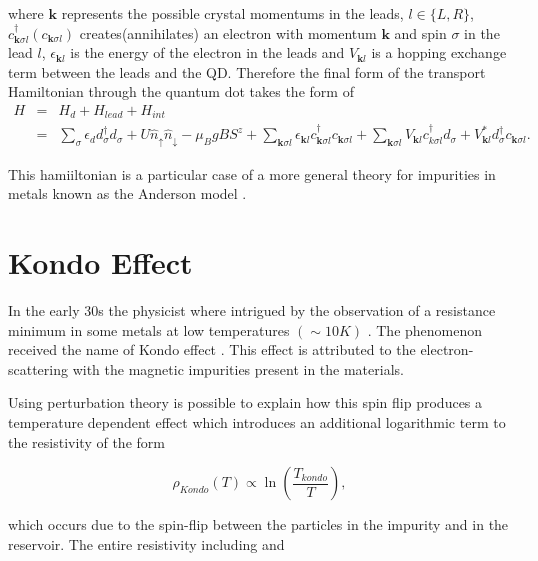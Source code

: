 where $\mathbf{k}$ represents the possible crystal momentums in the
leads, $l\in\{L,R\}$, $c_{\mathbf{k}\sigma l}^{\dagger}(c_{\mathbf{k}\sigma l})$
creates(annihilates) an electron with momentum $\mathbf{k}$ and spin
$\sigma$ in the lead $l$, $\epsilon_{\mathbf{k}l}$ is the energy
of the electron in the leads and $V_{\mathbf{k}l}$ is a hopping exchange
term between the leads and the QD. Therefore the final form of the
transport Hamiltonian through the quantum dot takes the form of 
\begin{eqnarray}
H & = & H_{d}+H_{lead}+H_{int}\nonumber \\
 & = & \sum_{\sigma}\epsilon_{d}d_{\sigma}^{\dagger}d_{\sigma}+U\hat{n}_{\uparrow}\hat{n}_{\downarrow}-\mu_{B}gBS^{z}+\sum_{\mathbf{k}\sigma l}\epsilon_{\mathbf{k}l}c_{\mathbf{k}\sigma l}^{\dagger}c_{\mathbf{k}\sigma l}+\sum_{\mathbf{k}\sigma l}V_{\mathbf{k}l}c_{k\sigma l}^{\dagger}d_{\sigma}+V_{\mathbf{k}l}^{*}d_{\sigma}^{\dagger}c_{\mathbf{k}\sigma l}.\label{eq:Anderson}
\end{eqnarray}


This hamiiltonian is a particular case of a more general theory for
impurities in metals known as the Anderson model \citep{anderson_localized_1961}.


\section{Kondo Effect}

In the early 30s the physicist where intrigued by the observation of a resistance minimum in some metals at low temperatures $(\sim 10K)$ \cite{sindel_numerical_2005} . The phenomenon received the name of Kondo effect \citep{hewson_kondo_1997}. This effect is attributed to the electron-scattering with the magnetic impurities present in the materials. 

Using perturbation theory is possible to explain how this spin flip produces a  temperature dependent effect which  introduces an additional logarithmic term to the resistivity of the form

\begin{equation}
\rho_{Kondo}(T) \propto \ln{\left( \frac{T_{kondo}}{T} \right)},
\label{logKondo}
\end{equation}



which occurs due to the spin-flip between the particles in the impurity and in the reservoir. The entire resistivity including  and 

